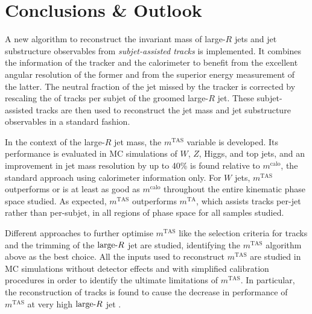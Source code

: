 \documentclass[UKenglish,texlive=2013]{\ATLASLATEXPATH atlasdoc}
\newcommand{\mta}{\ensuremath{m^\textrm{TA}}\xspace}
\newcommand{\mtas}{\ensuremath{m^\textrm{TAS}}\xspace}
\newcommand{\mcalo}{\ensuremath{m^\textrm{calo}}\xspace}
\newcommand{\larger}{\ensuremath{\textrm{large}\hbox{-}R}\xspace}
\begin{document}

\clearpage
\section{Conclusions \& Outlook}
\label{sec:conclusions}
A new algorithm to reconstruct the invariant mass of large-$R$ jets and jet substructure observables from {\em subjet-assisted tracks} is implemented. It combines the information of the tracker and the calorimeter to benefit from the excellent angular resolution of the former and from the superior energy measurement of the latter. The neutral fraction of the jet missed by the tracker is corrected by rescaling the \pt of tracks per subjet of the groomed large-$R$ jet. These subjet-assisted tracks are then used to reconstruct the jet mass and jet substructure observables in a standard fashion.

In the context of the large-$R$ jet mass, the \mtas variable is developed. Its performance is evaluated  in MC simulations of $W$, $Z$, Higgs, and top jets, and an improvement in jet mass resolution by up to 40\% is found relative to  \mcalo, the standard approach using calorimeter information only. For $W$ jets, \mtas outperforms or is at least as good as \mcalo throughout the entire kinematic phase space studied. As expected, \mtas outperforms \mta, which assists tracks per-jet rather than per-subjet, in all regions of phase space for all samples studied. 

Different approaches to further optimise \mtas like the selection criteria for tracks and the trimming of the \larger jet are studied, identifying the \mtas algorithm above as the best choice. All the inputs used to reconstruct \mtas are studied in MC simulations without detector effects and with simplified calibration procedures in order to identify the ultimate limitations of \mtas. In particular, the \pt reconstruction of tracks is found to cause the decrease in performance of \mtas at very high \larger jet \pt.
\end{document}
